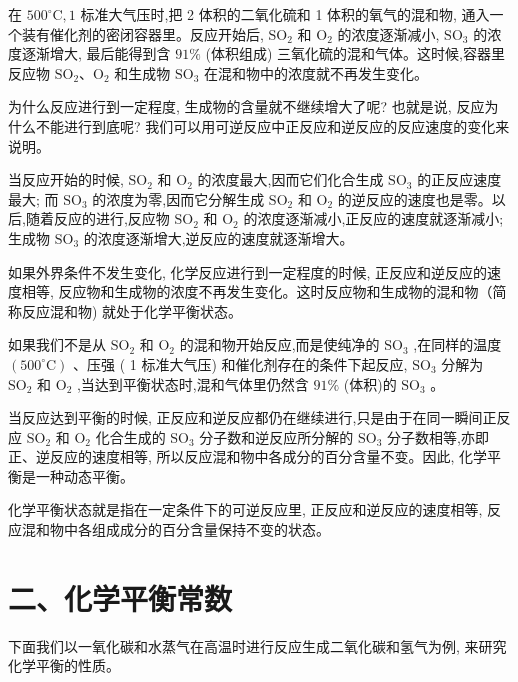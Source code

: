 \documentclass[10pt]{article}
\begin{document}
在 \({500}^{ \circ }\mathrm{C},1\) 标准大气压时,把 2 体积的二氧化硫和 1 体积的氧气的混和物, 通入一个装有催化剂的密闭容器里。反应开始后, \({\mathrm{{SO}}}_{2}\) 和 \({\mathrm{O}}_{2}\) 的浓度逐渐减小, \({\mathrm{{SO}}}_{3}\) 的浓度逐渐增大, 最后能得到含 \({91}\%\) (体积组成) 三氧化硫的混和气体。这时候,容器里反应物 \({\mathrm{{SO}}}_{2}\text{、}{\mathrm{O}}_{2}\) 和生成物 \({\mathrm{{SO}}}_{3}\) 在混和物中的浓度就不再发生变化。

为什么反应进行到一定程度, 生成物的含量就不继续增大了呢? 也就是说, 反应为什么不能进行到底呢? 我们可以用可逆反应中正反应和逆反应的反应速度的变化来说明。

当反应开始的时候, \({\mathrm{{SO}}}_{2}\) 和 \({\mathrm{O}}_{2}\) 的浓度最大,因而它们化合生成 \({\mathrm{{SO}}}_{3}\) 的正反应速度最大; 而 \({\mathrm{{SO}}}_{3}\) 的浓度为零,因而它分解生成 \({\mathrm{{SO}}}_{2}\) 和 \({\mathrm{O}}_{2}\) 的逆反应的速度也是零。以后,随着反应的进行,反应物 \({\mathrm{{SO}}}_{2}\) 和 \({\mathrm{O}}_{2}\) 的浓度逐渐减小,正反应的速度就逐渐减小; 生成物 \({\mathrm{{SO}}}_{3}\) 的浓度逐渐增大,逆反应的速度就逐渐增大。

如果外界条件不发生变化, 化学反应进行到一定程度的时候, 正反应和逆反应的速度相等, 反应物和生成物的浓度不再发生变化。这时反应物和生成物的混和物（简称反应混和物) 就处于化学平衡状态。

如果我们不是从 \({\mathrm{{SO}}}_{2}\) 和 \({\mathrm{O}}_{2}\) 的混和物开始反应,而是使纯净的 \({\mathrm{{SO}}}_{3}\) ,在同样的温度 \(\left( {{500}^{ \circ }\mathrm{C}}\right)\) 、压强 ( 1 标准大气压) 和催化剂存在的条件下起反应, \({\mathrm{{SO}}}_{3}\) 分解为 \({\mathrm{{SO}}}_{2}\) 和 \({\mathrm{O}}_{2}\) ,当达到平衡状态时,混和气体里仍然含 \({91}\%\) (体积)的 \({\mathrm{{SO}}}_{3}\) 。

当反应达到平衡的时候, 正反应和逆反应都仍在继续进行,只是由于在同一瞬间正反应 \({\mathrm{{SO}}}_{2}\) 和 \({\mathrm{O}}_{2}\) 化合生成的 \({\mathrm{{SO}}}_{3}\) 分子数和逆反应所分解的 \({\mathrm{{SO}}}_{3}\) 分子数相等,亦即正、逆反应的速度相等, 所以反应混和物中各成分的百分含量不变。因此, 化学平衡是一种动态平衡。

化学平衡状态就是指在一定条件下的可逆反应里, 正反应和逆反应的速度相等, 反应混和物中各组成成分的百分含量保持不变的状态。

\section*{二、化学平衡常数}

下面我们以一氧化碳和水蒸气在高温时进行反应生成二氧化碳和氢气为例, 来研究化学平衡的性质。
\end{document}
